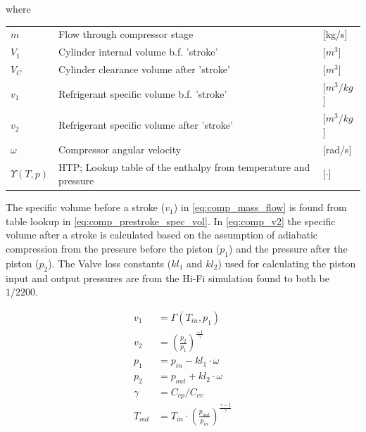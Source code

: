 where

\begin{center}
	\begin{tabular}{l p{10cm} l}
		$\dot{m}$       & Flow through compressor stage                                   & [\si{kg}/\si{s}]     \\
		$V_1$           & Cylinder internal volume b.f. 'stroke'                          & [$\si{m}^3$]         \\
		$V_C$           & Cylinder clearance volume after 'stroke'                        & [$\si{m}^3$]         \\
		$v_1$           & Refrigerant specific volume b.f. 'stroke'                       & [$\si{m}^3/\si{kg}$] \\
		$v_2$           & Refrigerant specific volume after 'stroke'                      & [$\si{m}^3/\si{kg}$] \\
		$\omega$        & Compressor angular velocity                                     & [\si{rad}/\si{s}]    \\
		$\Upsilon(T,p)$ & HTP; Lookup table of the enthalpy from temperature and pressure & [$\cdot$]            \\
	\end{tabular}
\end{center}

The specific volume before a stroke ($v_1$) in \cref{eq:comp_mass_flow} is found from table lookup in \cref{eq:comp_prestroke_spec_vol}. In \cref{eq:comp_v2} the specific volume after a stroke is calculated based on the assumption of adiabatic compression from the pressure before the piston ($p_1$) and the pressure after the piston ($p_2$). The Valve loss constants ($kl_1$ and $kl_2$) used for calculating the piston input and output pressures are from the Hi-Fi simulation found to both be $1/2200$.

\begin{align}
	v_1     & = \Gamma(T_{in},p_{1}) \label{eq:comp_prestroke_spec_vol}                   \\
	v_2     & = \left(\frac{p_2}{p_1}\right)^{\frac{-1}{\gamma}} \label{eq:comp_v2}                         \\
	p_1     & = p_{in} - kl_1 \cdot \omega \label{eq:comp_p1}                                               \\
	p_2     & = p_{out} + kl_2 \cdot \omega \label{eq:comp_p2}                                              \\
	\gamma  & = C_{cp}/C_{cv} \label{eq:comp_gamma}                                                            \\
	T_{out} & = T_{in}\cdot \left(\frac{p_{out}}{p_{in}}\right)^{\frac{\gamma-1}{\gamma}} \label{eq:comp_Tout}
\end{align}

